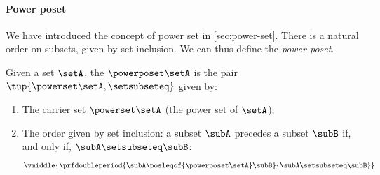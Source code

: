 \paragraph{Power poset}


We have introduced the concept of power set in \cref{sec:power-set}.
There is a natural order on subsets, given by set inclusion.
We can thus define the \emph{power poset}.

\begin{marginfigure}
    \centering
    \caption{The power poset $\powerposet\Emptyset$.}
    \label{fig:powersetcat0}
\end{marginfigure}
\begin{marginfigure}
    \centering
    \caption{The power poset $\powerposet\makeset{\posela}$.}
    \label{fig:powersetcat1}
\end{marginfigure}
\begin{definition}
    \label{def:power-poset}
    Given a set $\setA$, the  $\powerposet\setA$ is the pair $\tup{\powerset\setA, \setsubseteq}$ given by:

    \constit
    \begin{enumerate}
        \item The carrier set $\powerset\setA$ (the power set of $\setA$);
        \item The order given by set inclusion: a subset $\subA$ precedes a subset $\subB$ if, and only if, $\subA \setsubseteq \subB$:
              \begin{equation} \label{eq:pospower}
                  \vmiddle{
                      \prfdoubleperiod{
                          \subA \posleqof{\powerposet\setA} \subB
                      }{
                          \subA \setsubseteq \subB
                      }
                  }
              \end{equation}
    \end{enumerate}
\end{definition}
\begin{marginfigure}
    \centering
    \caption{The power poset $\powerposet\makeset{\posela,\poselb}$.}
    \label{fig:powersetcat2}
\end{marginfigure}
\begin{marginfigure}
    \centering
    \caption{The power poset $\powerposet\makeset{\posela,\poselb,\poselc}$.}
    \label{fig:powersetcat3}
\end{marginfigure}
